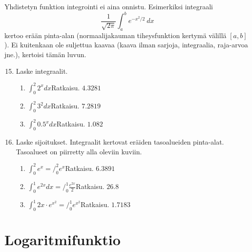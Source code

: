 \documentclass[10pt]{article}
\newcommand{\ratkaisu}[1]{\hfill{\color{blue}\quad\textrm{Ratkaisu. } #1}}
\begin{document}
Yhdistetyn funktion integrointi ei aina onnistu. Esimerkiksi integraali
$$
\frac{1}{\sqrt{2\pi}}
\int_a^b e^{-x^2/2}~dx
$$
kertoo erään pinta-alan (normaalijakauman tiheysfunktion kertymä välillä $[a,b]$). Ei kuitenkaan ole suljettua kaavaa (kaava ilman sarjoja, integraalia, raja-arvoa jne.), kertoisi tämän luvun. 
\begin{enumerate}
\setcounter{enumi}{14}
\item Laske integraalit.
\begin{enumerate}
\item $\int_0^2 2^xdx$\ratkaisu{$4.3281$}
\item $\int_0^2 3^2dx$\ratkaisu{$7.2819$}
\item $\int_0^2 0.5^xdx$\ratkaisu{$1.082$}
\end{enumerate}
\item Laske sijoitukset. Integraalit kertovat eräiden tasoalueiden pinta-alat. Tasoalueet on piirretty alla oleviin kuviin.
\begin{enumerate}
\item $\int_0^2 e^x=\bigg/_0^2 e^x$\ratkaisu{$6.3891$}
\item $\int_0^1 e^{2x}dx=\bigg/_0^1 \frac{e^{2x}}{2}$\ratkaisu{$26.8$}
\item $\int_0^1 2x\cdot e^{x^2}=\bigg/_0^1 e^{x^2}$\ratkaisu{$1.7183$}
\end{enumerate}
\end{enumerate}


\newpage

\section{Logaritmifunktio}
\end{document}
